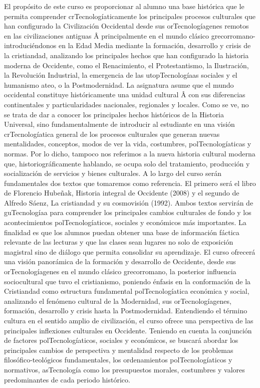 \begin{syllabus}


\begin{justification}
El propósito de este curso es proporcionar al alumno una base histórica que le permita comprender crTecnologíaticamente los principales procesos culturales que han configurado la Civilización Occidental desde sus orTecnologíagenes remotos en las civilizaciones antiguas Â principalmente en el mundo clásico grecorromano- introduciéndonos en la Edad Media mediante la formación, desarrollo y crisis de la cristiandad,  analizando los principales hechos que han configurado la historia moderna de Occidente, como el Renacimiento, el Protestantismo, la Ilustración, la Revolución Industrial, la emergencia de las utopTecnologíaas sociales y el humanismo ateo, o la Postmodernidad.
La asignatura asume que el mundo occidental constituye históricamente una unidad cultural Â con sus diferencias continentales y particularidades nacionales, regionales y locales.
Como se ve, no se trata de dar a conocer los principales hechos históricos de la Historia Universal,  sino fundamentalmente de introducir al estudiante en una visión crTecnologíatica general de los procesos culturales que generan nuevas mentalidades, conceptos, modos de ver la vida, costumbres, polTecnologíaticas y normas. Por lo dicho, tampoco nos referimos a la nueva historia cultural moderna que, historiográficamente hablando, se ocupa solo del tratamiento, producción y socialización de servicios y bienes culturales.
A lo largo del curso serán fundamentales dos textos que tomaremos como referencia. El primero será el libro de Florencio Hubeñak, Historia integral de Occidente (2008) y el segundo de Alfredo Sáenz, La cristiandad y su cosmovisión (1992). Ambos textos servirán de guTecnologíaa para comprender los principales cambios culturales de fondo y los acontecimientos polTecnologíaticos, sociales y económicos más importantes.
La finalidad es que los alumnos puedan obtener una base de información fáctica relevante de las lecturas y que las clases sean lugares no solo de exposición magistral sino de diálogo que permita consolidar su aprendizaje.
El curso ofrecerá una visión panorámica de la formación y desarrollo de Occidente, desde sus orTecnologíagenes en el mundo clásico grecorromano, la posterior influencia sociocultural que tuvo el cristianismo, poniendo énfasis en la conformación de la Cristiandad como estructura fundamental polTecnologíatica económica y social, analizando el fenómeno cultural de la Modernidad, sus orTecnologíagenes, formación, desarrollo y crisis hasta la Postmodernidad.  Entendiendo el término cultura en el sentido amplio de civilización, el curso ofrece una perspectiva de las principales inflexiones culturales en Occidente.
Teniendo en cuenta la conjunción de factores polTecnologíaticos, sociales y económicos, se buscará abordar los principales cambios de perspectiva y mentalidad respecto de los problemas filosófico-teológicos fundamentales, los ordenamientos polTecnologíaticos y normativos, asTecnología como los presupuestos morales, costumbres y valores predominantes de cada periodo histórico.
\end{justification}


\end{syllabus}
